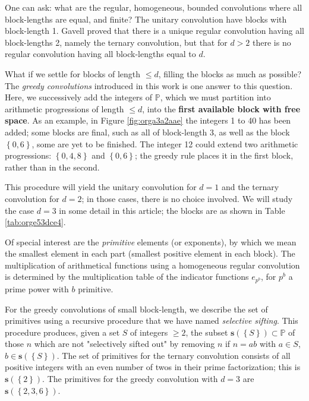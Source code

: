 \documentclass[12pt]{article}
\theoremstyle{definition}
\theoremstyle{remark}
\theoremstyle{plain}
\newcommand{\set}[1]{\left\{{#1}\right\}}
\newcommand{\NNp}{{\mathbb{P}}}
\newcommand{\ssift}[1]{\mathbf{s}({#1})}
\begin{document}
One can ask: what are the regular, homogeneous, bounded convolutions where all block-lengths
are equal, and finite? The unitary convolution have blocks with block-length 1.
Gavell \cite{Gavell:Regular} proved that there is a unique regular convolution having all block-lengths 2,
namely the ternary convolution,
but that for \(d > 2\)
there is no regular convolution having all block-lengths equal to \(d\).

What if we settle for blocks of length \(\le d\), filling
the blocks as much as possible? The \emph{greedy convolutions} introduced in this work is one answer to
this question. Here, we successively add the integers of \(\NNp\), which we must partition into
arithmetic progressions of length \(\le d\), into the \textbf{first available block with free space}.
As an example, in Figure \ref{fig:orga3a2aae} the integers 1 to 40 has been added; some blocks are final,
such as all of block-length 3, as well as the block \(\set{0,6}\),
some are yet to be finished. The integer 12 could extend two arithmetic progressions: \(\set{0,4,8}\) and
\(\set{0,6}\); the greedy rule places it in the first block, rather than in the second.

This procedure will yield the unitary convolution for \(d=1\) and the ternary convolution for
\(d=2\); in those cases, there is no choice involved.
We will study the case \(d=3\) in some detail in this article; the blocks are as shown in
Table \ref{tab:orge53dce4}.

Of special interest are the \emph{primitive} elements (or exponents), by which we mean the smallest element
in each part (smallest positive element in each block). The multiplication of arithmetical functions
using a homogeneous regular convolution is determined by the multiplication table of the indicator functions
\(e_{{p^{b}}}\), for \(p^{b}\) a prime power with \(b\) primitive. 

For the greedy convolutions of small block-length, we describe the set of primitives
using a recursive procedure that we have named
\emph{selective sifting}. This procedure produces, given a set \(S\) of integers \(\ge 2\), the subset
\(\ssift{\set{S}} \subset \NNp\) of those \(n\) which are not "selectively sifted out" by removing \(n\)
if \(n=ab\) with \(a \in S\), \(b \in \ssift{\set{S}}\). The set of primitives
for the ternary convolution consists of all positive integers with an even number of twos in their
prime factorization; this is \(\ssift{\set{2}}\). The primitives for the greedy convolution with \(d=3\)
are \(\ssift{\set{2,3,6}}\).
\end{document}
